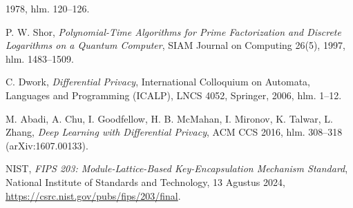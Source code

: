 \documentclass[11pt,a4paper,oneside]{book}
\theoremstyle{definition}
\theoremstyle{plain}
\theoremstyle{remark}
\begin{document}
\begin{sloppypar}
\begin{enumerate}[label={[\arabic*]},leftmargin=1.8em]
        1978, hlm. 120--126.
  \item P. W. Shor, \emph{Polynomial-Time Algorithms for Prime Factorization and
        Discrete Logarithms on a Quantum Computer}, SIAM Journal on Computing
        26(5), 1997, hlm. 1483--1509.
  \item C. Dwork, \emph{Differential Privacy}, International Colloquium on
        Automata, Languages and Programming (ICALP), LNCS 4052, Springer, 2006,
        hlm. 1--12.
  \item M. Abadi, A. Chu, I. Goodfellow, H. B. McMahan, I. Mironov, K. Talwar,
        L. Zhang, \emph{Deep Learning with Differential Privacy}, ACM CCS 2016,
        hlm. 308--318 (arXiv:1607.00133).
  \item NIST, \emph{FIPS 203: Module-Lattice-Based Key-Encapsulation Mechanism
        Standard}, National Institute of Standards and Technology, 13 Agustus
        2024, \url{https://csrc.nist.gov/pubs/fips/203/final}.
\end{enumerate}
\end{sloppypar}
\end{document}
